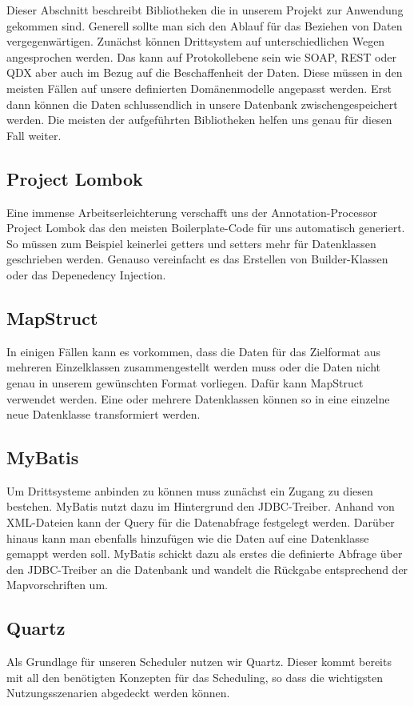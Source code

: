 \label{sec:libraries}
Dieser Abschnitt beschreibt Bibliotheken die in unserem Projekt zur Anwendung gekommen sind. Generell sollte man sich den Ablauf für das Beziehen von Daten vergegenwärtigen. Zunächst können Drittsystem auf unterschiedlichen Wegen angesprochen werden. Das kann auf Protokollebene sein wie SOAP, REST oder QDX aber auch im Bezug auf die Beschaffenheit der Daten. Diese müssen in den meisten Fällen auf unsere definierten Domänenmodelle angepasst werden. Erst dann können die Daten schlussendlich in unsere Datenbank zwischengespeichert werden. Die meisten der aufgeführten Bibliotheken helfen uns genau für diesen Fall weiter.

\subsection*{Project Lombok}
Eine immense Arbeitserleichterung verschafft uns der Annotation-Processor Project Lombok das den meisten Boilerplate-Code für uns automatisch generiert. So müssen zum Beispiel keinerlei getters und setters mehr für Datenklassen geschrieben werden. Genauso vereinfacht es das Erstellen von Builder-Klassen oder das Depenedency Injection.

\subsection*{MapStruct}
In einigen Fällen kann es vorkommen, dass die Daten für das Zielformat aus mehreren Einzelklassen zusammengestellt werden muss oder die Daten nicht genau in unserem gewünschten Format vorliegen. Dafür kann MapStruct verwendet werden. Eine oder mehrere Datenklassen können so in eine einzelne neue Datenklasse transformiert werden.

\subsection*{MyBatis}
Um Drittsysteme anbinden zu können muss zunächst ein Zugang zu diesen bestehen. MyBatis nutzt dazu im Hintergrund den JDBC-Treiber. Anhand von XML-Dateien kann der Query für die Datenabfrage festgelegt werden. Darüber hinaus kann man ebenfalls hinzufügen wie die Daten auf eine Datenklasse gemappt werden soll. MyBatis schickt dazu als erstes die definierte Abfrage über den JDBC-Treiber an die Datenbank und wandelt die Rückgabe entsprechend der Mapvorschriften um.

\subsection*{Quartz}
Als Grundlage für unseren Scheduler nutzen wir Quartz. Dieser kommt bereits mit all den benötigten Konzepten für das Scheduling, so dass die wichtigsten Nutzungsszenarien abgedeckt werden können.

